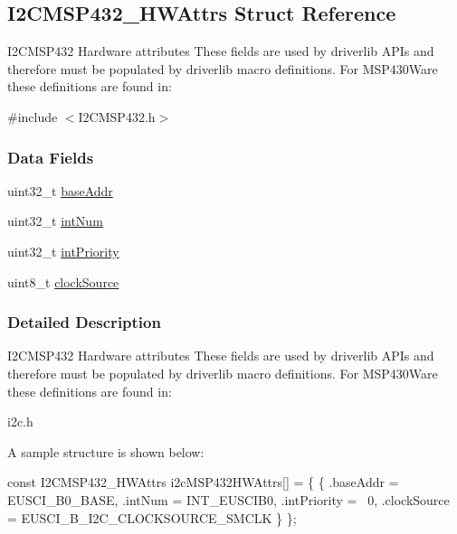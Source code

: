 \subsection{I2\+C\+M\+S\+P432\+\_\+\+H\+W\+Attrs Struct Reference}
\label{struct_i2_c_m_s_p432___h_w_attrs}


I2\+C\+M\+S\+P432 Hardware attributes These fields are used by driverlib A\+P\+Is and therefore must be populated by driverlib macro definitions. For M\+S\+P430\+Ware these definitions are found in\+:  




{\ttfamily \#include $<$I2\+C\+M\+S\+P432.\+h$>$}

\subsubsection*{Data Fields}
\begin{DoxyCompactItemize}
\item 
uint32\+\_\+t \hyperlink{struct_i2_c_m_s_p432___h_w_attrs_af6b7344c40ce9dbe5a729f4bdb9d5aea}{base\+Addr}
\item 
uint32\+\_\+t \hyperlink{struct_i2_c_m_s_p432___h_w_attrs_a7340a590cf64eb1f8d19182886ff570d}{int\+Num}
\item 
uint32\+\_\+t \hyperlink{struct_i2_c_m_s_p432___h_w_attrs_acc897c0f3c4af3fd5320836c1d9b7f43}{int\+Priority}
\item 
uint8\+\_\+t \hyperlink{struct_i2_c_m_s_p432___h_w_attrs_a228090214e295c525a96470d87c8a40c}{clock\+Source}
\end{DoxyCompactItemize}


\subsubsection{Detailed Description}
I2\+C\+M\+S\+P432 Hardware attributes These fields are used by driverlib A\+P\+Is and therefore must be populated by driverlib macro definitions. For M\+S\+P430\+Ware these definitions are found in\+: 


\begin{DoxyItemize}
\item i2c.\+h
\end{DoxyItemize}

A sample structure is shown below\+: 
\begin{DoxyCode}
\textcolor{keyword}{const} I2CMSP432_HWAttrs i2cMSP432HWAttrs[] = \{
    \{
        .baseAddr = EUSCI\_B0\_BASE,
        .intNum = INT\_EUSCIB0,
        .intPriority = ~0,
        .clockSource = EUSCI\_B\_I2C\_CLOCKSOURCE\_SMCLK
    \}
\};
\end{DoxyCode}
 

